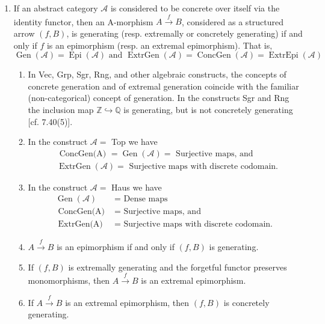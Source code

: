 \begin{example}
    \begin{enumerate}
        \item If an abstract category $\mathcal{A}$ is considered to be concrete over itself via the identity functor, then an A-morphism $A \xrightarrow{f} B$, considered as a structured arrow $(f, B)$, is generating (resp. extremally or concretely generating) if and only if $f$ is an epimorphism (resp. an extremal epimorphism). That is,
        $$
        \operatorname{Gen}(\mathcal{A})=\operatorname{Epi}(\mathcal{A}) \text { and } \operatorname{ExtrGen}(\mathcal{A})=\operatorname{ConcGen}(\mathcal{A})=\operatorname{ExtrEpi}(\mathcal{A})
        $$
        \begin{enumerate}
            \item In Vec, Grp, Sgr, Rng, and other algebraic constructs, the concepts of concrete generation and of extremal generation coincide with the familiar (non-categorical) concept of generation.
            In the constructs Sgr and Rng the inclusion map $\mathbb{Z} \hookrightarrow \mathbb{Q}$ is generating, but is not concretely generating [cf. 7.40(5)].

            \item In the construct $\mathcal{A}=$ Top we have
            $$
            \begin{aligned}
            & \text { ConcGen(A) }=\operatorname{Gen}(\mathcal{A})=\text { Surjective maps, and } \\
            & \operatorname{ExtrGen}(\mathcal{A})=\text { Surjective maps with discrete codomain. }
            \end{aligned}
            $$

            \item In the construct $\mathcal{A}=$ Haus we have
            $$
            \begin{aligned}
            \operatorname{Gen}(\mathcal{A}) & =\text { Dense maps } \\
            \text { ConcGen(A) } & =\text { Surjective maps, and } \\
            \text { ExtrGen(A) } & =\text { Surjective maps with discrete codomain. }
            \end{aligned}
            $$
        \item $A \xrightarrow{f} B$ is an epimorphism if and only if $(f, B)$ is generating.
\item If $(f, B)$ is extremally generating and the forgetful functor preserves monomorphisms, then $A \xrightarrow{f} B$ is an extremal epimorphism.
\item If $A \xrightarrow{f} B$ is an extremal epimorphism, then $(f, B)$ is concretely generating.    
        \end{enumerate}
    \end{enumerate}
\end{example}
